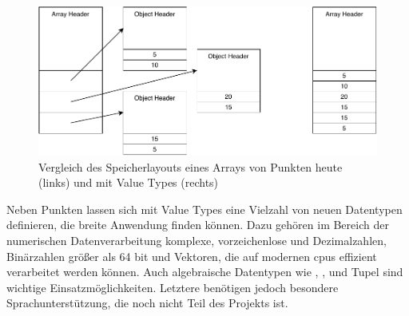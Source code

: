 \begin{figure}[htp]
    \centering
    \includegraphics[width=\textwidth]{img/memory-usage.pdf}
    \vspace{-3ex}
    \caption{Vergleich des Speicherlayouts eines Arrays von Punkten heute (links) und mit Value Types (rechts)}
    \label{fig:memory-usage}
\end{figure}

Neben Punkten lassen sich mit Value Types eine Vielzahl von neuen Datentypen definieren, die breite Anwendung finden können.
Dazu gehören im Bereich der numerischen Datenverarbeitung komplexe, vorzeichenlose und Dezimalzahlen, Binärzahlen größer als 64 bit und Vektoren, die auf modernen \acp{cpu} effizient verarbeitet werden können.
Auch algebraische Datentypen wie , ,  und Tupel sind wichtige Einsatzmöglichkeiten.
Letztere benötigen jedoch besondere Sprachunterstützung, die noch nicht Teil des Projekts ist.
